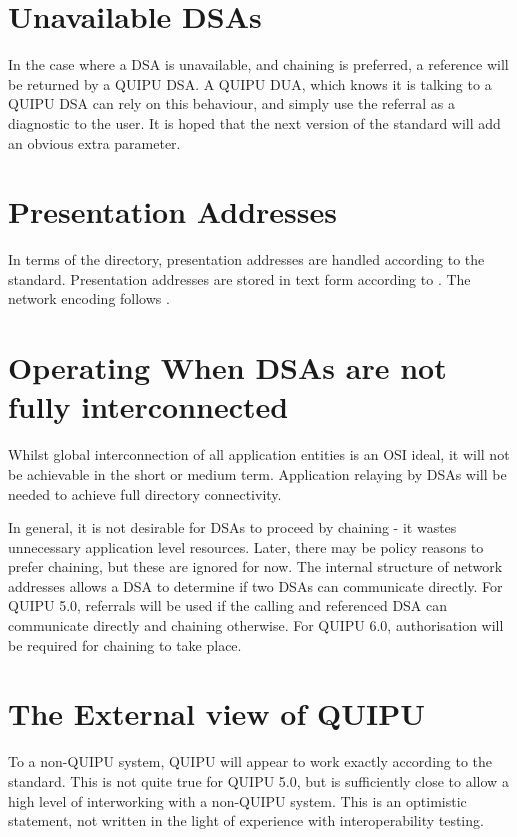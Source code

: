 \section {Unavailable DSAs}

In the case where a DSA is unavailable, and chaining is preferred, a reference
will be returned by a QUIPU DSA.  
A QUIPU DUA, which knows it is talking to a QUIPU DSA
can rely on this behaviour, and simply use the referral as a diagnostic to
the user.  It is hoped that the next version of the standard will add an
obvious extra parameter.



\section {Presentation Addresses}

In terms of the directory, presentation addresses are handled according to
the standard.  Presentation addresses are stored in text form according to 
\cite {PSAP.String}.   The network encoding follows \cite {NSAP.Approach}.

\section {Operating When DSAs are not fully interconnected}
\label {tcp-only}

Whilst global interconnection of all application entities is an OSI ideal,
it will not be achievable in the short or medium term.  Application relaying
by DSAs will be needed to achieve full directory connectivity.  


In general, it is not desirable for DSAs to proceed by chaining - it wastes
unnecessary application level resources.  Later, there may be policy reasons
to prefer chaining, but these are ignored for now.  The internal structure
of network addresses allows a DSA to determine if two DSAs can communicate
directly.  For QUIPU 5.0, referrals will be used if the calling and
referenced DSA can communicate directly and chaining otherwise.  For QUIPU
6.0, authorisation will be required for chaining to take place.


\section {The External view of QUIPU}

To a non-QUIPU system, QUIPU will appear to work exactly according to the
standard.  This is not quite true for QUIPU 5.0, but is sufficiently close to
allow a high level of interworking with a non-QUIPU system.  This is an
optimistic statement, not written in the light of experience with
interoperability testing.

